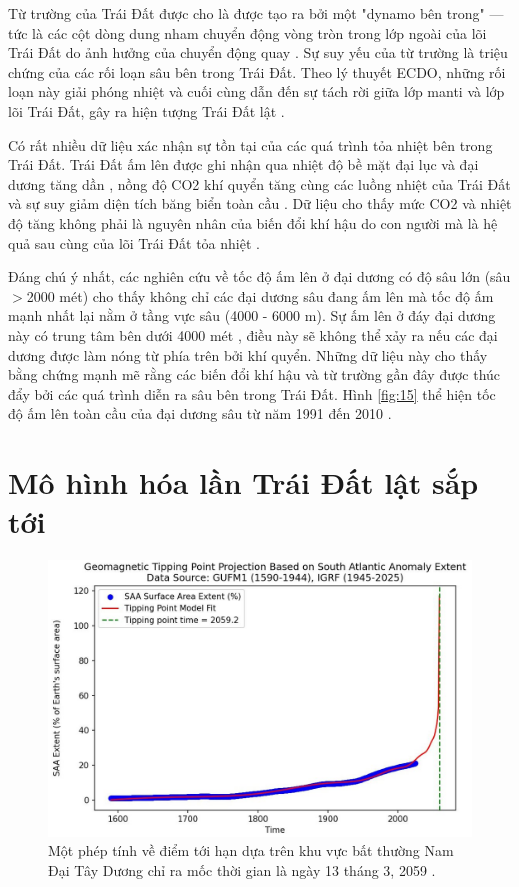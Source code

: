 \documentclass[10pt,twocolumn,letterpaper]{article}
\begin{document}
Từ trường của Trái Đất được cho là được tạo ra bởi một "dynamo bên trong" — tức là các cột dòng dung nham chuyển động vòng tròn trong lớp ngoài của lõi Trái Đất do ảnh hưởng của chuyển động quay \cite{123}. Sự suy yếu của từ trường là triệu chứng của các rối loạn sâu bên trong Trái Đất. Theo lý thuyết ECDO, những rối loạn này giải phóng nhiệt và cuối cùng dẫn đến sự tách rời giữa lớp manti và lớp lõi Trái Đất, gây ra hiện tượng Trái Đất lật \cite{1}.

Có rất nhiều dữ liệu xác nhận sự tồn tại của các quá trình tỏa nhiệt bên trong Trái Đất. Trái Đất ấm lên được ghi nhận qua nhiệt độ bề mặt đại lục và đại dương tăng dần \cite{127,128}, nồng độ CO2 khí quyển tăng cùng các luồng nhiệt của Trái Đất \cite{129,130} và sự suy giảm diện tích băng biển toàn cầu \cite{131}. Dữ liệu cho thấy mức CO2 và nhiệt độ tăng không phải là nguyên nhân của biến đổi khí hậu do con người mà là hệ quả sau cùng của lõi Trái Đất tỏa nhiệt \cite{129}.

Đáng chú ý nhất, các nghiên cứu về tốc độ ấm lên ở đại dương có độ sâu lớn (sâu $>$2000 mét) cho thấy không chỉ các đại dương sâu đang ấm lên mà tốc độ ấm mạnh nhất lại nằm ở tầng vực sâu (4000 - 6000 m). Sự ấm lên ở đáy đại dương này có trung tâm bên dưới 4000 mét \cite{132,129}, điều này sẽ không thể xảy ra nếu các đại dương được làm nóng từ phía trên bởi khí quyển. Những dữ liệu này cho thấy bằng chứng mạnh mẽ rằng các biến đổi khí hậu và từ trường gần đây được thúc đẩy bởi các quá trình diễn ra sâu bên trong Trái Đất. Hình \ref{fig:15} thể hiện tốc độ ấm lên toàn cầu của đại dương sâu từ năm 1991 đến 2010 \cite{132}.

\section{Mô hình hóa lần Trái Đất lật sắp tới}
\begin{figure}[b]
\begin{center}
   \includegraphics[width=1\linewidth]{saa-crop.jpeg}
\end{center}
   \caption{Một phép tính về điểm tới hạn dựa trên khu vực bất thường Nam Đại Tây Dương chỉ ra mốc thời gian là ngày 13 tháng 3, 2059 \cite{125,126}.}
\label{fig:16}
\label{fig:onecol}
\end{figure}
\end{document}
